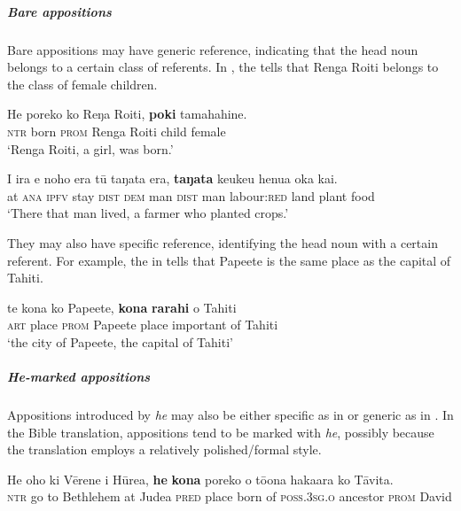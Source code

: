 \subparagraph{Bare appositions} Bare appositions may have generic reference, indicating that the head noun belongs to a certain class of referents. In , the  tells that Renga Roiti belongs to the class of female children. 

\ea\label{ex:5.165}
\gll He poreko ko Reŋa Roiti, \textbf{poki} tamahahine. \\
\textsc{ntr} born \textsc{prom} Renga Roiti child female \\

\glt 
‘Renga Roiti, a girl, was born.’ \textstyleExampleref{[Mtx-7-15.002]}
\z

\ea\label{ex:5.166}
\gll {\ꞌ}I ira e noho era tū taŋata era, \textbf{taŋata} keukeu henua {\ꞌ}oka kai. \\
at \textsc{ana} \textsc{ipfv} stay \textsc{dist} \textsc{dem} man \textsc{dist} man labour:\textsc{red} land plant food \\

\glt
‘There that man lived, a farmer who planted crops.’ \textstyleExampleref{[R372.036]} 
\z

They may also have specific reference, identifying the head noun with a certain referent. For example, the  in  tells that Papeete is the same place as the capital of Tahiti.

\ea\label{ex:5.167}
\gll te kona ko Pape{\ꞌ}ete, \textbf{kona} \textbf{rarahi} o Tahiti \\
\textsc{art} place \textsc{prom} Papeete place important of Tahiti \\

\glt 
‘the city of Papeete, the capital of Tahiti’ \textstyleExampleref{[R231.045]} 
\z

\subparagraph{\textit{He}-marked appositions} Appositions introduced by \textit{he} may also be either specific as in  or generic as in . In the Bible translation, appositions tend to be marked with \textit{he}, possibly because the translation employs a relatively polished/formal style.

\ea\label{ex:5.168}
\gll He oho ki Vērene {\ꞌ}i Hūrea, \textbf{he} \textbf{kona} poreko o tō{\ꞌ}ona hakaara  ko Tāvita.\\
\textsc{ntr} go to Bethlehem at Judea \textsc{pred} place born of \textsc{poss.3sg.o} ancestor  \textsc{prom} David\\

